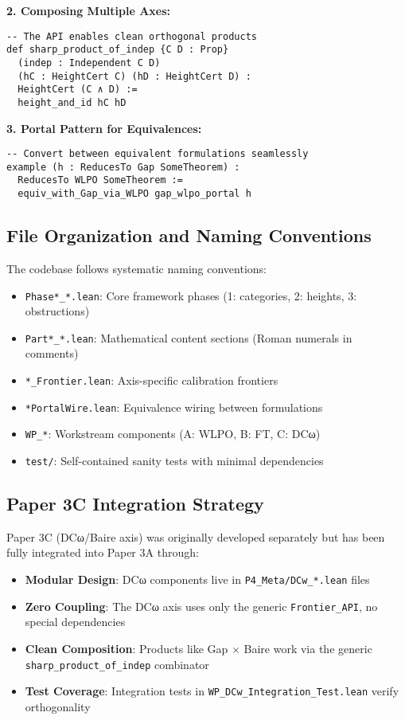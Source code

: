 \documentclass[11pt]{article}
\theoremstyle{plain}
\theoremstyle{definition}
\begin{document}
\textbf{2. Composing Multiple Axes:}
\begin{verbatim}
-- The API enables clean orthogonal products
def sharp_product_of_indep {C D : Prop}
  (indep : Independent C D)
  (hC : HeightCert C) (hD : HeightCert D) :
  HeightCert (C ∧ D) := 
  height_and_id hC hD
\end{verbatim}

\textbf{3. Portal Pattern for Equivalences:}
\begin{verbatim}
-- Convert between equivalent formulations seamlessly
example (h : ReducesTo Gap SomeTheorem) : 
  ReducesTo WLPO SomeTheorem :=
  equiv_with_Gap_via_WLPO gap_wlpo_portal h
\end{verbatim}

\subsection{File Organization and Naming Conventions}

The codebase follows systematic naming conventions:
\begin{itemize}
\item \texttt{Phase*\_*.lean}: Core framework phases (1: categories, 2: heights, 3: obstructions)
\item \texttt{Part*\_*.lean}: Mathematical content sections (Roman numerals in comments)
\item \texttt{*\_Frontier.lean}: Axis-specific calibration frontiers
\item \texttt{*PortalWire.lean}: Equivalence wiring between formulations
\item \texttt{WP\_*}: Workstream components (A: WLPO, B: FT, C: DCω)
\item \texttt{test/}: Self-contained sanity tests with minimal dependencies
\end{itemize}

\subsection{Paper 3C Integration Strategy}

Paper 3C (DCω/Baire axis) was originally developed separately but has been fully integrated into Paper 3A through:
\begin{itemize}
\item \textbf{Modular Design}: DCω components live in \texttt{P4\_Meta/DCw\_*.lean} files
\item \textbf{Zero Coupling}: The DCω axis uses only the generic \texttt{Frontier\_API}, no special dependencies
\item \textbf{Clean Composition}: Products like Gap $\times$ Baire work via the generic \texttt{sharp\_product\_of\_indep} combinator
\item \textbf{Test Coverage}: Integration tests in \texttt{WP\_DCw\_Integration\_Test.lean} verify orthogonality
\end{itemize}
\end{document}
